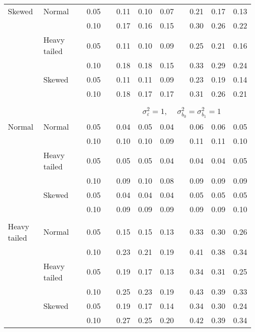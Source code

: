 \begin{table}[ht]
\begin{scriptsize}
\begin{center}
\begin{tabular}{ll p{.1cm} c p{.1cm} rrr p{.1cm} rrr}
Skewed       & Normal       && 0.05 &&  0.11 & 0.10 & 0.07 && 0.21 & 0.17 & 0.13 \\ 
             &              && 0.10 &&  0.17 & 0.16 & 0.15 && 0.30 & 0.26 & 0.22 \\ 
             & Heavy tailed && 0.05 &&  0.11 & 0.10 & 0.09 && 0.25 & 0.21 & 0.16 \\ 
             &              && 0.10 &&  0.18 & 0.18 & 0.15 && 0.33 & 0.29 & 0.24 \\ 
             & Skewed       && 0.05 &&  0.11 & 0.11 & 0.09 && 0.23 & 0.19 & 0.14 \\ 
             &              && 0.10 &&  0.18 & 0.17 & 0.17 && 0.31 & 0.26 & 0.21 \\ 

&&&&&&&&&&&\\
& && && \multicolumn{7}{c}{$\sigma_{\varepsilon}^2 = 1$, \ \ $\sigma_{b_0}^2 = \sigma_{b_1}^2 = 1$} \\ \cline{6-12}
\rowcolor{gray!20}Normal       & Normal       && 0.05 &&  0.04 & 0.05 & 0.04 && 0.06 & 0.06 & 0.05 \\ 
\rowcolor{gray!20}             &              && 0.10 &&  0.10 & 0.10 & 0.09 && 0.11 & 0.11 & 0.10 \\ 
\rowcolor{gray!20}             & Heavy tailed && 0.05 &&  0.05 & 0.05 & 0.04 && 0.04 & 0.04 & 0.05 \\ 
\rowcolor{gray!20}             &              && 0.10 &&  0.09 & 0.10 & 0.08 && 0.09 & 0.09 & 0.09 \\ 
\rowcolor{gray!20}             & Skewed       && 0.05 &&  0.04 & 0.04 & 0.04 && 0.05 & 0.05 & 0.05 \\ 
\rowcolor{gray!20}             &              && 0.10 &&  0.09 & 0.09 & 0.09 && 0.09 & 0.09 & 0.10 \\ 
             &&&&&&&&&&&\\
Heavy tailed & Normal       && 0.05 &&  0.15 & 0.15 & 0.13 && 0.33 & 0.30 & 0.26 \\ 
             &              && 0.10 &&  0.23 & 0.21 & 0.19 && 0.41 & 0.38 & 0.34 \\ 
             & Heavy tailed && 0.05 &&  0.19 & 0.17 & 0.13 && 0.34 & 0.31 & 0.25 \\ 
             &              && 0.10 &&  0.25 & 0.23 & 0.19 && 0.43 & 0.39 & 0.33 \\ 
             & Skewed       && 0.05 &&  0.19 & 0.17 & 0.14 && 0.34 & 0.30 & 0.24 \\ 
             &              && 0.10 &&  0.27 & 0.25 & 0.20 && 0.42 & 0.39 & 0.34 \\ 

\end{tabular}
\end{center}
\end{scriptsize}
\end{table}
